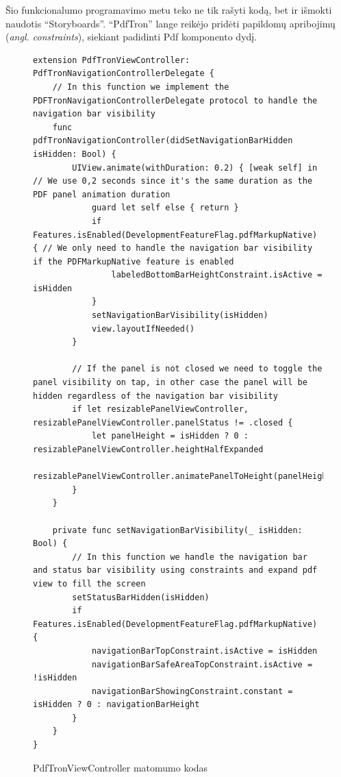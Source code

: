 Šio funkcionalumo programavimo metu teko ne tik rašyti kodą, bet ir išmokti naudotis \enquote{Storyboards}. \enquote{PdfTron} lange reikėjo pridėti papildomų apribojimų (\emph{angl. constraints}), siekiant padidinti Pdf komponento dydį.


\begin{figure}[htbp!]
    \centering
\begin{verbatim}
extension PdfTronViewController: PdfTronNavigationControllerDelegate {
    // In this function we implement the PDFTronNavigationControllerDelegate protocol to handle the navigation bar visibility
    func pdfTronNavigationController(didSetNavigationBarHidden isHidden: Bool) { 
        UIView.animate(withDuration: 0.2) { [weak self] in // We use 0,2 seconds since it's the same duration as the PDF panel animation duration
            guard let self else { return }
            if Features.isEnabled(DevelopmentFeatureFlag.pdfMarkupNative) { // We only need to handle the navigation bar visibility if the PDFMarkupNative feature is enabled
                labeledBottomBarHeightConstraint.isActive = isHidden
            }
            setNavigationBarVisibility(isHidden)
            view.layoutIfNeeded()
        }

        // If the panel is not closed we need to toggle the panel visibility on tap, in other case the panel will be hidden regardless of the navigation bar visibility
        if let resizablePanelViewController, resizablePanelViewController.panelStatus != .closed { 
            let panelHeight = isHidden ? 0 : resizablePanelViewController.heightHalfExpanded
            resizablePanelViewController.animatePanelToHeight(panelHeight)
        }
    }

    private func setNavigationBarVisibility(_ isHidden: Bool) {
        // In this function we handle the navigation bar and status bar visibility using constraints and expand pdf view to fill the screen
        setStatusBarHidden(isHidden)
        if Features.isEnabled(DevelopmentFeatureFlag.pdfMarkupNative) {
            navigationBarTopConstraint.isActive = isHidden
            navigationBarSafeAreaTopConstraint.isActive = !isHidden
            navigationBarShowingConstraint.constant = isHidden ? 0 : navigationBarHeight
        }
    }
}
\end{verbatim}
\caption{PdfTronViewController matomumo kodas}
    \label{fig:pdfTronCode}
\end{figure}

\newpage
    
